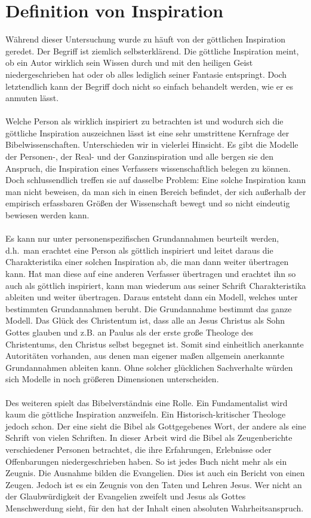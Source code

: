 \section{Definition von Inspiration}
Während dieser Untersuchung wurde zu häuft von der göttlichen Inspiration geredet. Der Begriff ist ziemlich selbsterklärend. Die göttliche Inspiration meint, ob ein Autor wirklich sein Wissen durch und mit den heiligen Geist niedergeschrieben hat oder ob alles  lediglich seiner Fantasie entspringt. Doch letztendlich kann der Begriff doch nicht so einfach behandelt werden, wie er es anmuten lässt.
\\~\\
Welche Person als wirklich inspiriert zu betrachten ist und wodurch sich die göttliche Inspiration auszeichnen lässt ist eine sehr umstrittene Kernfrage der Bibelwissenschaften. Unterschieden wir in vielerlei Hinsicht. Es gibt die Modelle der Personen-, der Real- und der Ganzinspiration und alle bergen sie den Anspruch, die Inspiration eines Verfassers wissenschaftlich belegen zu können. Doch schlussendlich treffen sie auf dasselbe Problem: Eine solche Inspiration kann man nicht beweisen, da man sich in einen Bereich befindet, der sich außerhalb der empirisch erfassbaren Größen der Wissenschaft bewegt und so nicht eindeutig bewiesen werden kann.
\\~\\
Es kann nur unter personenspezifischen Grundannahmen beurteilt werden, d.h.\ man erachtet eine Person als göttlich inspiriert und leitet daraus die Charakteristika  einer solchen Inspiration ab, die man dann weiter übertragen kann. Hat man diese auf eine anderen Verfasser übertragen und erachtet ihn so auch als göttlich inspiriert, kann man wiederum aus seiner Schrift Charakteristika ableiten und weiter übertragen. Daraus entsteht dann ein Modell, welches unter bestimmten Grundannahmen beruht. Die Grundannahme bestimmt das ganze Modell. Das Glück des Christentum ist, dass alle an Jesus Christus als Sohn Gottes glauben und z.B. an Paulus als der erste große Theologe des Christentums, den Christus selbst begegnet ist. Somit sind einheitlich anerkannte Autoritäten vorhanden, aus denen man eigener maßen allgemein anerkannte Grundannahmen ableiten kann. Ohne solcher glücklichen Sachverhalte würden sich Modelle in noch größeren Dimensionen unterscheiden.
\\~\\
Des weiteren spielt das Bibelverständnis eine Rolle. Ein Fundamentalist wird kaum die göttliche Inspiration anzweifeln. Ein Historisch-kritischer Theologe jedoch schon. Der eine sieht die Bibel als Gottgegebenes Wort, der andere als eine Schrift von vielen Schriften. In dieser Arbeit wird die Bibel als Zeugenberichte verschiedener Personen betrachtet, die ihre Erfahrungen, Erlebnisse oder Offenbarungen niedergeschrieben haben. So ist jedes Buch nicht mehr als ein Zeugnis. Die Ausnahme bilden die Evangelien. Dies ist auch ein Bericht von einen Zeugen. Jedoch ist es ein Zeugnis von den Taten und Lehren Jesus. Wer nicht an der Glaubwürdigkeit der Evangelien zweifelt und Jesus als Gottes Menschwerdung sieht, für den hat der Inhalt einen absoluten Wahrheitsanspruch.
